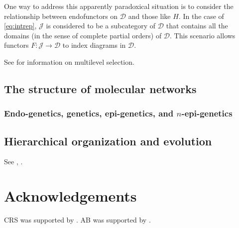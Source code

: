 \documentclass[aps,twocolumn]{revtex4}
\begin{document}
One way to address this apparently paradoxical situation is to consider the relationship between endofunctors on $\mathcal{D}$ and those like $H$. In the case of \ref{eq:intrep}, $\mathcal{J}$ is considered to be a subcategory of $\mathcal{D}$ that contains all the domains (in the sense of complete partial orders) of $\mathcal{D}$. This scenario allows functors $F:\mathcal{J} \rightarrow \mathcal{D}$ to index diagrams in $\mathcal{D}$.

See \cite{Okasha2006} for information on multilevel selection.

\subsection{The structure of molecular networks}
\subsubsection{Endo-genetics, genetics, epi-genetics, and $n$-epi-genetics}
\subsection{Hierarchical organization and evolution}
See \cite{Gould1994}, \cite{Arnold1982}.

\section*{Acknowledgements} 

CRS was supported by . 
AB was supported by .

\appendix
\end{document}
